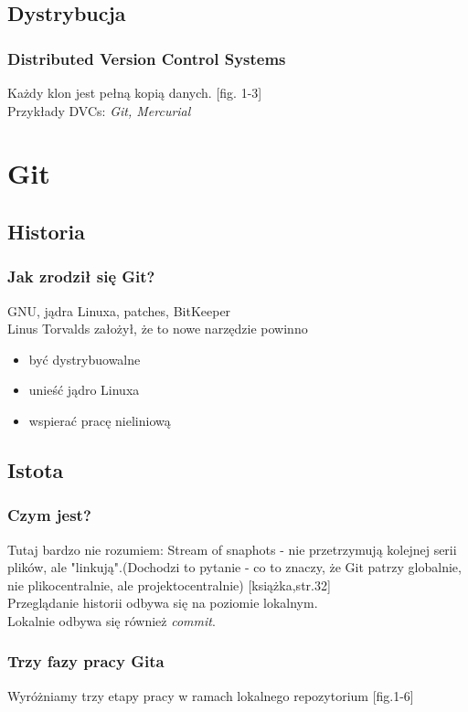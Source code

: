 \documentclass{beamer}
\begin{document}
\subsection{Dystrybucja}
\begin{frame}
 \frametitle{\textbf{D}istributed \textbf{V}ersion \textbf{C}ontrol \textbf{S}ystems}
  Każdy klon jest pełną kopią danych.
  [fig. 1-3]
  \\Przykłady DVCs: \textit{Git, Mercurial}
\end{frame}

\section{Git}
\subsection{Historia}
\begin{frame}
 \frametitle{Jak zrodził się Git?}
GNU, jądra Linuxa, patches, BitKeeper \\
Linus Torvalds założył, że to nowe narzędzie powinno \\
  \begin{itemize}
  \item być dystrybuowalne
  \item unieść jądro Linuxa
  \item wspierać pracę nieliniową
 \end{itemize}
\end{frame}

\subsection{Istota}
\begin{frame}
 \frametitle{Czym jest?}
 Tutaj bardzo nie rozumiem:
 Stream of snaphots - nie przetrzymują kolejnej serii plików, ale "linkują".(Dochodzi to pytanie - co to znaczy, że Git patrzy globalnie, nie plikocentralnie, ale projektocentralnie)
 [książka,str.32]\\
 Przeglądanie historii odbywa się na poziomie lokalnym.\\
 Lokalnie odbywa się również \textit{commit}.\\
\end{frame}

\begin{frame}
 \frametitle{Trzy fazy pracy Gita}
 Wyróżniamy trzy etapy pracy w ramach lokalnego repozytorium
 [fig.1-6]
\end{frame}
\end{document}
